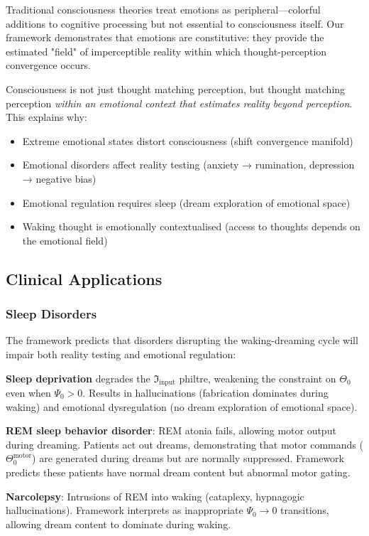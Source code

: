\documentclass[11pt,a4paper]{article}
\begin{document}
Traditional consciousness theories treat emotions as peripheral—colorful additions to cognitive processing but not essential to consciousness itself. Our framework demonstrates that emotions are constitutive: they provide the estimated "field" of imperceptible reality within which thought-perception convergence occurs.

Consciousness is not just thought matching perception, but thought matching perception \textit{within an emotional context that estimates reality beyond perception}. This explains why:
\begin{itemize}
\item Extreme emotional states distort consciousness (shift convergence manifold)
\item Emotional disorders affect reality testing (anxiety → rumination, depression → negative bias)
\item Emotional regulation requires sleep (dream exploration of emotional space)
\item Waking thought is emotionally contextualised (access to thoughts depends on the emotional field)
\end{itemize}

\subsection{Clinical Applications}

\subsubsection{Sleep Disorders}

The framework predicts that disorders disrupting the waking-dreaming cycle will impair both reality testing and emotional regulation:

\textbf{Sleep deprivation} degrades the $\Im_{\text{input}}$ philtre, weakening the constraint on $\Theta_0$ even when $\Psi_0 > 0$. Results in hallucinations (fabrication dominates during waking) and emotional dysregulation (no dream exploration of emotional space).

\textbf{REM sleep behavior disorder}: REM atonia fails, allowing motor output during dreaming. Patients act out dreams, demonstrating that motor commands ($\Theta_0^{\text{motor}}$) are generated during dreams but are normally suppressed. Framework predicts these patients have normal dream content but abnormal motor gating.

\textbf{Narcolepsy}: Intrusions of REM into waking (cataplexy, hypnagogic hallucinations). Framework interprets as inappropriate $\Psi_0 \to 0$ transitions, allowing dream content to dominate during waking.
\end{document}
